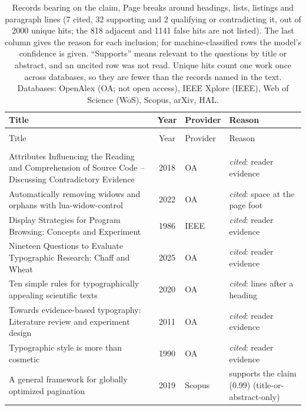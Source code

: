 
\begingroup\footnotesize
\begin{longtable}{@{}%
  >{\raggedright\arraybackslash}p{}c%
  >{\raggedright\arraybackslash}p{}%
  >{\raggedright\arraybackslash}p{}@{}}
\caption{Records bearing on the claim, Page breaks around headings, lists, listings and paragraph lines (7 cited, 32 supporting and 2 qualifying or contradicting it, out of 2000 unique hits; the 818 adjacent and 1141 false hits are not listed). The last column gives the reason for each inclusion; for machine-classified rows the model's confidence is given. \enquote{Supports} means relevant to the questions by title or abstract, and an uncited row was not read. Unique hits count one work once across databases, so they are fewer than the records named in the text. Databases: OpenAlex (OA; not open access), IEEE Xplore (IEEE), Web of Science (WoS), Scopus, arXiv, HAL.}\label{tab:pb-hits}\\
\toprule
Title & Year & Provider & Reason \\
\midrule
\endfirsthead
\multicolumn{4}{@{}l}{\emph{\tablename~\thetable{} (cont.)}}\\
\toprule
Title & Year & Provider & Reason \\
\midrule
\endhead
\midrule \multicolumn{4}{r@{}}{\emph{continued on next page}}\\
\endfoot
\bottomrule
\endlastfoot
Attributes Influencing the Reading and Comprehension of Source Code -- Discussing Contradictory Evidence & 2018 & OA & \emph{cited}: reader evidence \\
Automatically removing widows and orphans with lua-widow-control & 2022 & OA & \emph{cited}: space at the page foot \\
Display Strategies for Program Browsing: Concepts and Experiment & 1986 & IEEE & \emph{cited}: reader evidence \\
Nineteen Questions to Evaluate Typographic Research: Chaff and Wheat & 2025 & OA & \emph{cited}: reader evidence \\
Ten simple rules for typographically appealing scientific texts & 2020 & OA & \emph{cited}: lines after a heading \\
Towards evidence-based typography: Literature review and experiment design & 2011 & OA & \emph{cited}: reader evidence \\
Typographic style is more than cosmetic & 1990 & OA & \emph{cited}: reader evidence \\
A general framework for globally optimized pagination & 2019 & Scopus & supports the claim (0.99) (title-or-abstract-only) \\

\end{longtable}

